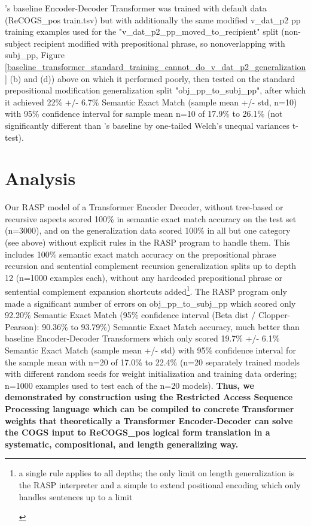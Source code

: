 \documentclass[11pt]{article}
\begin{document}
\cite{Wu2023}'s baseline Encoder-Decoder Transformer was trained with default data (ReCOGS\_pos train.tsv) but with additionally the same modified v\_dat\_p2 pp training examples used for the "v\_dat\_p2\_pp\_moved\_to\_recipient" split (non-subject recipient modified with prepositional phrase, so nonoverlapping with subj\_pp, Figure \ref{baseline_transformer_standard_training_cannot_do_v_dat_p2_generalization} (b) and (d)) above on which it performed poorly, then tested on the standard prepositional modification generalization split "obj\_pp\_to\_subj\_pp", after which it achieved 22\% +/- 6.7\% Semantic Exact Match (sample mean +/- std, n=10) with 95\% confidence interval for sample mean n=10 of 17.9\% to 26.1\% (not significantly different than \cite{Wu2023}'s baseline by one-tailed Welch's unequal variances t-test). 

\section{Analysis} 
Our RASP model of a Transformer Encoder Decoder, without tree-based or recursive aspects scored 100\% in semantic exact match accuracy on the \cite{Wu2023} test set (n=3000), and on the generalization data scored 100\% in all but one category (see above) without explicit rules in the RASP program to handle them. This includes 100\% semantic exact match accuracy on the prepositional phrase recursion and sentential complement recursion generalization splits up to depth 12 (n=1000 examples each), without any hardcoded prepositional phrase or sentential complement expansion shortcuts added\footnote{\begin{footnotesize}a single rule applies to all depths; the only limit on length generalization is the RASP interpreter and a simple to extend positional encoding which only handles sentences up to a limit
\end{footnotesize}}. The RASP program only made a significant number of errors on obj\_pp\_to\_subj\_pp which scored only 92.20\% Semantic Exact Match (95\% confidence interval (Beta dist / Clopper-Pearson): 90.36\% to 93.79\%) Semantic Exact Match accuracy, much better than \cite{Wu2023} baseline Encoder-Decoder Transformers which only scored 19.7\% +/- 6.1\% Semantic Exact Match (sample mean +/- std) with 95\% confidence interval for the sample mean with n=20 of 17.0\% to 22.4\% (n=20 separately trained models with different random seeds for weight initialization and training data ordering; n=1000 examples used to test each of the n=20 models). \textbf{Thus, we demonstrated by construction using the Restricted Access Sequence Processing language which can be compiled to concrete Transformer weights that theoretically a Transformer Encoder-Decoder can solve the COGS input to ReCOGS\_pos logical form translation in a systematic, compositional, and length generalizing way.}
\end{document}
